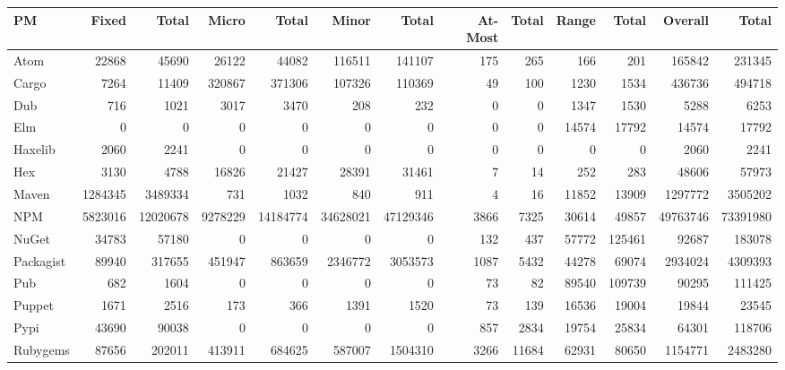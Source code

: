 \begin{tabular}{|l|rrrrrrrrrr|rr|}
\hline
PM & Fixed & Total & Micro & Total & Minor & Total & At-Most & Total & Range & Total & Overall & Total \\
\hline
Atom & 22868 & 45690 & 26122 & 44082 & 116511 & 141107 & 175 & 265 & 166 & 201 & 165842 & 231345 \\
Cargo & 7264 & 11409 & 320867 & 371306 & 107326 & 110369 & 49 & 100 & 1230 & 1534 & 436736 & 494718 \\
Dub & 716 & 1021 & 3017 & 3470 & 208 & 232 & 0 & 0 & 1347 & 1530 & 5288 & 6253 \\
Elm & 0 & 0 & 0 & 0 & 0 & 0 & 0 & 0 & 14574 & 17792 & 14574 & 17792 \\
Haxelib & 2060 & 2241 & 0 & 0 & 0 & 0 & 0 & 0 & 0 & 0 & 2060 & 2241 \\
Hex & 3130 & 4788 & 16826 & 21427 & 28391 & 31461 & 7 & 14 & 252 & 283 & 48606 & 57973 \\
Maven & 1284345 & 3489334 & 731 & 1032 & 840 & 911 & 4 & 16 & 11852 & 13909 & 1297772 & 3505202 \\
NPM & 5823016 & 12020678 & 9278229 & 14184774 & 34628021 & 47129346 & 3866 & 7325 & 30614 & 49857 & 49763746 & 73391980 \\
NuGet & 34783 & 57180 & 0 & 0 & 0 & 0 & 132 & 437 & 57772 & 125461 & 92687 & 183078 \\
Packagist & 89940 & 317655 & 451947 & 863659 & 2346772 & 3053573 & 1087 & 5432 & 44278 & 69074 & 2934024 & 4309393 \\
Pub & 682 & 1604 & 0 & 0 & 0 & 0 & 73 & 82 & 89540 & 109739 & 90295 & 111425 \\
Puppet & 1671 & 2516 & 173 & 366 & 1391 & 1520 & 73 & 139 & 16536 & 19004 & 19844 & 23545 \\
Pypi & 43690 & 90038 & 0 & 0 & 0 & 0 & 857 & 2834 & 19754 & 25834 & 64301 & 118706 \\
Rubygems & 87656 & 202011 & 413911 & 684625 & 587007 & 1504310 & 3266 & 11684 & 62931 & 80650 & 1154771 & 2483280 \\
\hline
\end{tabular}

